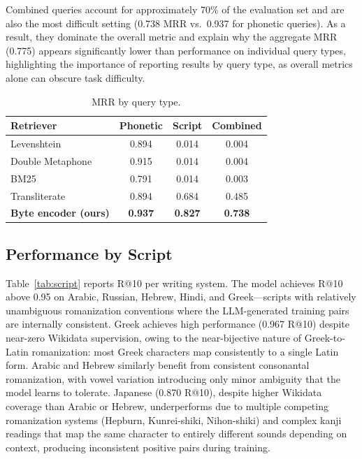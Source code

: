 \documentclass[sigconf]{acmart}
\begin{document}
Combined queries account for approximately 70\% of the evaluation set and are also the most difficult setting (0.738 MRR vs.\ 0.937 for phonetic queries). As a result, they dominate the overall metric and explain why the aggregate MRR (0.775) appears significantly lower than performance on individual query types, highlighting the importance of reporting results by query type, as overall metrics alone can obscure task difficulty.

\begin{table}[h]
\centering
\caption{MRR by query type.}
\label{tab:querytype}
\begin{tabular}{lccc}
\toprule
Retriever & Phonetic & Script & Combined \\
\midrule
Levenshtein & 0.894 & 0.014 & 0.004 \\
Double Metaphone & 0.915 & 0.014 & 0.004 \\
BM25 & 0.791 & 0.014 & 0.003 \\
Transliterate & 0.894 & 0.684 & 0.485 \\
\textbf{Byte encoder (ours)} & \textbf{0.937} & \textbf{0.827} & \textbf{0.738} \\
\bottomrule
\end{tabular}
\end{table}

\subsection{Performance by Script}

Table~\ref{tab:script} reports R@10 per writing system.
The model achieves R@10 above 0.95 on Arabic, Russian, Hebrew, Hindi, and Greek---scripts with relatively unambiguous romanization conventions where the LLM-generated training pairs are internally consistent. Greek achieves high performance (0.967 R@10) despite near-zero Wikidata supervision, owing to the near-bijective nature of Greek-to-Latin romanization: most Greek characters map consistently to a single Latin form. Arabic and Hebrew similarly benefit from consistent consonantal romanization, with vowel variation introducing only minor ambiguity that the model learns to tolerate. Japanese (0.870 R@10), despite higher Wikidata coverage than Arabic or Hebrew, underperforms due to multiple competing romanization systems (Hepburn, Kunrei-shiki, Nihon-shiki) and complex kanji readings that map the same character to entirely different sounds depending on context, producing inconsistent positive pairs during training.
\end{document}
